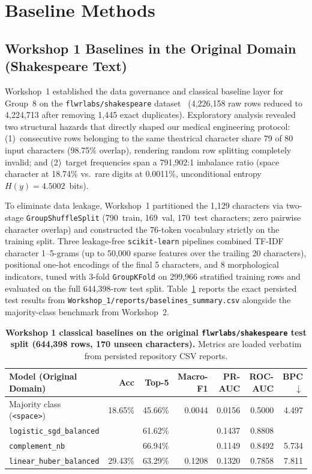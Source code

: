 \section{Baseline Methods}
\label{sec:baselines}

\subsection{Workshop 1 Baselines in the Original Domain (Shakespeare Text)}
Workshop~1 established the data governance and classical baseline layer for Group~8 on the \texttt{flwrlabs/shakespeare} dataset~\cite{Caldas2018leaf} (4,226,158 raw rows reduced to 4,224,713 after removing 1,445 exact duplicates). Exploratory analysis revealed two structural hazards that directly shaped our medical engineering protocol: (1)~consecutive rows belonging to the same theatrical character share 79 of 80 input characters (98.75\% overlap), rendering random row splitting completely invalid; and (2)~target frequencies span a 791,902:1 imbalance ratio (space character at 18.74\% vs.\ rare digits at 0.0011\%, unconditional entropy $H(y)=4.5002$~bits).

To eliminate data leakage, Workshop~1 partitioned the 1,129 characters via two-stage \texttt{GroupShuffleSplit} (790~train, 169~val, 170~test characters; zero pairwise character overlap) and constructed the 76-token vocabulary strictly on the training split. Three leakage-free \texttt{scikit-learn} pipelines combined TF-IDF character 1--5-grams (up to 50,000 sparse features over the trailing 20 characters), positional one-hot encodings of the final 5 characters, and 8 morphological indicators, tuned with 3-fold \texttt{GroupKFold} on 299,966 stratified training rows and evaluated on the full 644,398-row test split. Table~\ref{tab:w1_baselines} reports the exact persisted test results from \texttt{Workshop\_1/reports/baselines\_summary.csv} alongside the majority-class benchmark from Workshop~2.

\begin{table}[htbp]
\centering
\caption{\textbf{Workshop 1 classical baselines on the original \texttt{flwrlabs/shakespeare} test split (644,398 rows, 170 unseen characters).} Metrics are loaded verbatim from persisted repository CSV reports.}
\label{tab:w1_baselines}
\small
\begin{tabular}{lrrrrrr}
\toprule
\textbf{Model (Original Domain)} & \textbf{Acc} & \textbf{Top-5} & \textbf{Macro-F1} & \textbf{PR-AUC} & \textbf{ROC-AUC} & \textbf{BPC $\downarrow$} \\
\midrule
Majority class (\texttt{<space>}) & 18.65\% & 45.66\% & 0.0044 & 0.0156 & 0.5000 & 4.497 \\
\texttt{logistic\_sgd\_balanced} & \WOneLogAcc{} & 61.62\% & \WOneLogFOne{} & 0.1437 & 0.8808 & \WOneLogBPC{} \\
\texttt{complement\_nb} & \WOneNBAcc{} & 66.94\% & \WOneNBFOne{} & 0.1149 & 0.8492 & 5.734 \\
\texttt{linear\_huber\_balanced} & 29.43\% & 63.29\% & 0.1208 & 0.1320 & 0.7858 & 7.811 \\
\bottomrule
\end{tabular}
\end{table}


